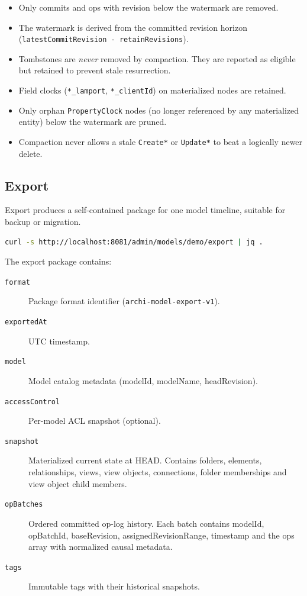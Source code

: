 \begin{itemize}
\item Only commits and ops with revision below the watermark are removed.
\item The watermark is derived from the committed revision horizon
  (\texttt{latestCommitRevision - retainRevisions}).
\item Tombstones are \emph{never} removed by compaction. They are reported
  as eligible but retained to prevent stale resurrection.
\item Field clocks (\texttt{*\_lamport}, \texttt{*\_clientId}) on
  materialized nodes are retained.
\item Only orphan \texttt{PropertyClock} nodes (no longer referenced by any
  materialized entity) below the watermark are pruned.
\item Compaction never allows a stale \texttt{Create*} or \texttt{Update*}
  to beat a logically newer delete.
\end{itemize}

\subsection{Export}

Export produces a self-contained package for one model timeline, suitable for
backup or migration.

\begin{lstlisting}[language=bash,caption={Export a model}]
curl -s http://localhost:8081/admin/models/demo/export | jq .
\end{lstlisting}

The export package contains:

\begin{description}
\item[\texttt{format}] Package format identifier (\texttt{archi-model-export-v1}).
\item[\texttt{exportedAt}] UTC timestamp.
\item[\texttt{model}] Model catalog metadata (modelId, modelName, headRevision).
\item[\texttt{accessControl}] Per-model ACL snapshot (optional).
\item[\texttt{snapshot}] Materialized current state at HEAD. Contains
  folders, elements, relationships, views, view objects, connections,
  folder memberships and view object child members.
\item[\texttt{opBatches}] Ordered committed op-log history. Each batch
  contains modelId, opBatchId, baseRevision, assignedRevisionRange,
  timestamp and the ops array with normalized causal metadata.
\item[\texttt{tags}] Immutable tags with their historical snapshots.
\end{description}

